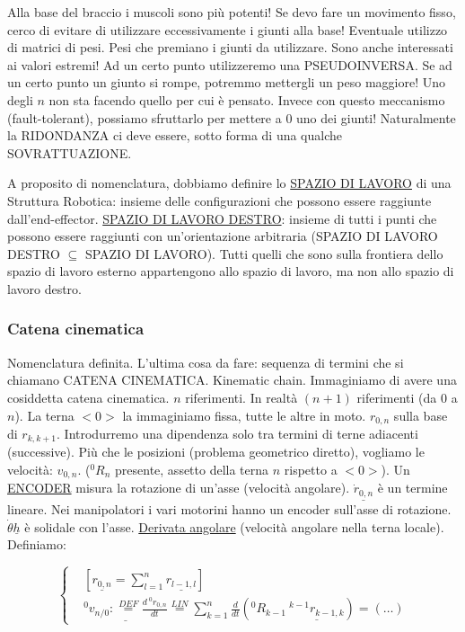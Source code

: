 Alla base del braccio i muscoli sono più potenti! Se devo fare un movimento fisso, cerco di evitare di utilizzare eccessivamente i giunti alla base! Eventuale utilizzo di matrici di pesi. Pesi che premiano i giunti da utilizzare. Sono anche interessati ai valori estremi! Ad un certo punto utilizzeremo una PSEUDOINVERSA. Se ad un certo punto un giunto si rompe, potremmo mettergli un peso maggiore! Uno degli $n$ non sta facendo quello per cui è pensato. Invece con questo meccanismo (fault-tolerant), possiamo sfruttarlo per mettere a 0 uno dei giunti! Naturalmente la RIDONDANZA ci deve essere, sotto forma di una qualche SOVRATTUAZIONE.

A proposito di nomenclatura, dobbiamo definire lo \underline{SPAZIO DI LAVORO} di una Struttura Robotica: insieme delle configurazioni che possono essere raggiunte dall'end-effector. \newline\underline{SPAZIO DI LAVORO DESTRO}: insieme di tutti i punti che possono essere raggiunti con un'orientazione arbitraria (SPAZIO DI LAVORO DESTRO $\subseteq$ SPAZIO DI LAVORO). Tutti quelli che sono sulla frontiera dello spazio di lavoro esterno appartengono allo spazio di lavoro, ma non allo spazio di lavoro destro.

\subsubsection{Catena cinematica}

Nomenclatura definita. L'ultima cosa da fare: sequenza di termini che si chiamano CATENA CINEMATICA. Kinematic chain. Immaginiamo di avere una cosiddetta catena cinematica. $n$ riferimenti. In realtà $(n+1)$ riferimenti (da $0$ a $n$). La terna $<0>$ la immaginiamo fissa, tutte le altre in moto. $r_{0,n}$ sulla base di $r_{k,k+1}$. Introdurremo una dipendenza solo tra termini di terne adiacenti (successive). Più che le posizioni (problema geometrico diretto), vogliamo le velocità: $v_{0,n}$. ($^0R_n$ presente, assetto della terna $n$ rispetto a $<0>$). Un \underline{ENCODER} misura la rotazione di un'asse (velocità angolare). $\underline{\dot{r}_{0,n}}$ è un termine lineare. Nei manipolatori i vari motorini hanno un encoder sull'asse di rotazione. $\dot{\theta}\underline{h}$ è solidale con l'asse. \underline{Derivata angolare} (velocità angolare nella terna locale). Definiamo:

\[
	\left\{
	\begin{aligned}
	&[\underline{r_{0,n}} = \sum_{l=1}^n{\underline{r_{l-1,l}}}]\\
	&\underline{^0v_{n/0} :\stackrel{DEF}{=} \frac{d\ ^0r_{0,n}}{dt}} \stackrel{LIN}{=} \sum_{k=1}^n{\frac{d}{dt}(^0R_{k-1}\ \underline{^{k-1}r_{k-1,k}})} = (\dots)
	\end{aligned}
	\right. 
\]

